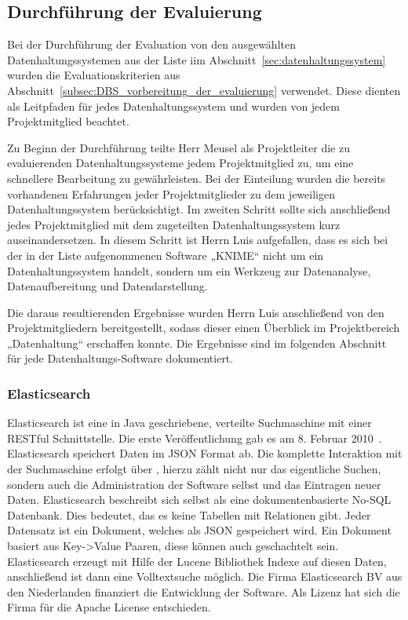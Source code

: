 \subsection{Durchführung der Evaluierung}
\label{subsec:durchfuehrung_der_evaluierung}
Bei der Durchführung der Evaluation von den ausgewählten Datenhaltungssystemen
aus der Liste iim Abschnitt~\ref{sec:datenhaltungssystem} wurden die
Evaluationskriterien aus
Abschnitt~\ref{subsec:DBS_vorbereitung_der_evaluierung} verwendet. Diese
dienten als Leitpfaden für jedes Datenhaltungssystem und wurden von jedem
Projektmitglied beachtet.

Zu Beginn der Durchführung teilte Herr Meusel als Projektleiter die zu
evaluierenden Datenhaltungssysteme jedem Projektmitglied zu, um eine schnellere
Bearbeitung zu gewährleisten. Bei der Einteilung wurden die bereits vorhandenen
Erfahrungen jeder Projektmitglieder zu dem jeweiligen Datenhaltungssystem
berücksichtigt. Im zweiten Schritt sollte sich anschließend jedes
Projektmitglied mit dem zugeteilten Datenhaltungssystem kurz auseinandersetzen.
In diesem Schritt ist Herrn Luis aufgefallen, dass es sich bei der in der Liste
aufgenommenen Software „KNIME“ nicht um ein Datenhaltungssystem handelt,
sondern um ein Werkzeug zur Datenanalyse, Datenaufbereitung und
Datendarstellung.

Die daraus resultierenden Ergebnisse wurden Herrn Luis anschließend von den
Projektmitgliedern bereitgestellt, sodass dieser einen Überblick im
Projektbereich „Datenhaltung“ erschaffen konnte. Die Ergebnisse sind im
folgenden Abschnitt für jede Datenhaltungs-Software dokumentiert.
\nl%

\subsubsection{Elasticsearch}
\label{subsubsec:elasticsearch}
Elasticsearch ist eine in Java geschriebene, verteilte Suchmaschine mit einer
\gls{RESTful} Schnittstelle. Die erste Veröffentlichung gab es am 8. Februar
2010~\cite{es_release}. Elasticsearch speichert Daten im \gls{JSON} Format ab.
Die komplette Interaktion mit der Suchmaschine erfolgt über
, hierzu zählt nicht nur das eigentliche Suchen, sondern
auch die Administration der Software selbst und das Eintragen neuer Daten.
Elasticsearch beschreibt sich selbst als eine dokumentenbasierte No-SQL
Datenbank. Dies bedeutet, das es keine Tabellen mit Relationen gibt. Jeder
Datensatz ist ein Dokument, welches als \gls{JSON} gespeichert wird. Ein
Dokument basiert aus Key->Value Paaren, diese können auch geschachtelt sein.
Elasticsearch erzeugt mit Hilfe der \gls{Lucene} Bibliothek Indexe auf diesen
Daten, anschließend ist dann eine Volltextsuche möglich. Die Firma
Elasticsearch BV aus den Niederlanden finanziert die Entwicklung der
Software. Als Lizenz hat sich die Firma für die Apache License entschieden.

